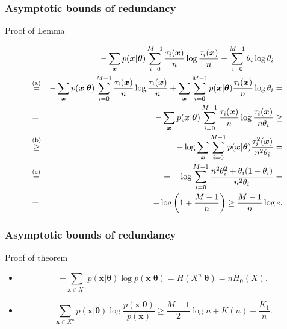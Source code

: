\documentclass[14pt]{beamer}
\renewcommand{\vec}[1]{\ensuremath{\boldsymbol{#1}}}
\begin{document}
\begin{frame}
\frametitle{Asymptotic bounds of redundancy}
Proof of Lemma
\footnotesize {
    
    \begin{eqnarray*}
    & & -\sum_{\vec x } p(\vec x | \vec \theta)%
     \sum_{i=0}^{M-1}\frac { \tau_i (\vec x)}{n} \log \frac {\tau_i (\vec x)}{n}%
     +\sum_{i=0}^{M-1} \theta_i\log \theta_i=\\
    &\stackrel{\rm (a)}{=}&
    -\sum_{\vec x } p(\vec x | \vec \theta)%
     \sum_{i=0}^{M-1}\frac { \tau_i (\vec x)}{n} \log \frac {\tau_i (\vec x)}{n}%
     +\sum_{\vec x } \sum_{i=0}^{M-1}p(\vec x | \vec \theta) %
     \frac {\tau_i (\vec x)}{n}\log \theta_i =\\%
    &=&-\sum_{\vec x } p(\vec x | \vec \theta)%
     \sum_{i=0}^{M-1}\frac { \tau_i (\vec x)}{n} %
     \log \frac {\tau_i (\vec x)}{n\theta_i }\ge\\%
    &\stackrel{\rm (b)}{\ge}&
     -\log\sum_{\vec x } \sum_{i=0}^{M-1}p(\vec x | \vec \theta)%
     \frac {\tau_i^2 (\vec x)}{n^2\theta_i}=\\
    &\stackrel{\rm (c)}{=}&
    =-\log\sum_{i=0}^{M-1}\frac{n^2\theta_i^2+%
    \theta_i(1-\theta_i)}{n^2\theta_i}=\\%
    &=&-\log \left( 1+\frac{M-1}{n}\right) \ge \frac{M-1}{n} \log e.
    \end{eqnarray*}
}    
\end{frame}



\begin{frame}
\frametitle{Asymptotic bounds of redundancy}
Proof of theorem
\begin{itemize}    

    \item
    \[
    -\sum_{\vec x \in X^n} p(\vec x | \vec \theta)%
    \log p(\vec x | \vec \theta)=H(X^n|\vec \theta )=nH_{\vec
    \theta}(X).
    \]
    
    \item
    \[
    \sum_{\vec x \in X^n} p(\vec x | \vec \theta)%
    \log \frac{p(\vec x | \vec \theta)}{p(\vec x)}\ge%
     \frac {M-1}{2} \log n + K(n)-\frac {K_1}{n} .
    \]

\end{itemize}
\end{frame}
\end{document}
